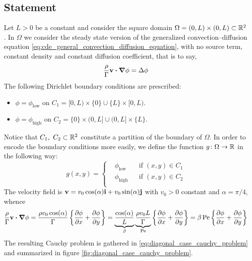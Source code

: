 
\subsection{Statement}

Let $L > 0$ be a constant and consider the square domain $\Omega = (0,L) \times
(0,L) \subset \mathbb{R}^2$. In $\Omega$ we consider the steady state version of the
generalized convection--diffusion equation
\eqref{eq:cde_general_convection_diffusion_equation}, with no source term,
constant density and constant diffusion coefficient, that is to say,
\begin{equation} \label{eq:diagcase_statement_pde1}
	\frac{\rho}{\Gamma} \vb{v} \vdot \grad{\phi} = \Delta{\phi}
\end{equation}
The following Dirichlet boundary conditions are prescribed:
\begin{itemize}[topsep=0pt]
	\item $\phi = \phi_\text{low}$ on $C_1 = [0,L) \times \{ 0 \} \cup \{ L \}
	\times [0,L)$.
	\item $\phi = \phi_\text{high}$ on $C_2 = \{ 0 \} \times (0,L] \cup (0,L]
	\times \{ L \}$.
\end{itemize}
Notice that $C_1, \ C_2 \subset \mathbb{R}^2$ constitute a partition of the boundary
of $\Omega$. In order to encode the boundary conditions more easily, we define
the function $g \colon \Omega \rightarrow \mathbb{R}$ in the following way:
\begin{equation}
	g(x,y) =
	\left\{
	\begin{aligned}
		&\phi_\text{low} 	& &\text{if } (x,y) \in C_1 \\
		&\phi_\text{high} 	& &\text{if } (x,y) \in C_2 \\
	\end{aligned}
	\right.
\end{equation}
The velocity field is $\vb{v} = v_0 \cos(\alpha) \vb{i} + v_0 \sin(\alpha)
\vb{j}$ with $v_0 > 0$ constant and $\alpha = \pi / 4$, whence
\begin{align}
	\frac{\rho}{\Gamma} \vb{v} \vdot \grad{\phi} = 
	\frac{\rho v_0 \cos(\alpha)}{\Gamma} \left\{ \pdv{\phi}{x} + \pdv{\phi}{y} \right\} = 
	\underbrace{\frac{\cos(\alpha)}{L}}_{\beta} 
	\underbrace{\frac{\rho v_0 L}{\Gamma}}_{\peclet} 
	\left\{ \pdv{\phi}{x} + \pdv{\phi}{y} \right\} = 
	\beta \, \peclet \left\{ \pdv{\phi}{x} + \pdv{\phi}{y} \right\}
\end{align}
The resulting Cauchy problem is gathered in
\eqref{eq:diagonal_case_cauchy_problem} and summarized in figure
\ref{fig:diagonal_case_cauchy_problem}.
